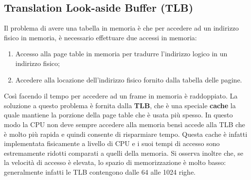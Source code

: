 \subsection{Translation Look-aside Buffer (TLB)}
Il problema di avere una tabella in memoria è che per accedere ad un indirizzo fisico in memoria, è necessario effettuare due accessi in memoria:
\vspace{-4px}
\begin{enumerate}
\setlength{\itemsep}{-1px}
    \item Accesso alla page table in memoria per tradurre l'indirizzo logico in un indirizzo fisico;
    \item Accedere alla locazione dell'indirizzo fisico fornito dalla tabella delle pagine.
\end{enumerate}
Così facendo il tempo per accedere ad un frame in memoria è raddoppiato. La soluzione a questo problema è fornita dalla \textbf{TLB}, che è una speciale \textbf{cache} la quale mantiene la porzione della page table che è usata più spesso. In questo modo la CPU non deve sempre accedere alla memoria bensì accede alla TLB che è molto più rapida e quindi consente di risparmiare tempo. Questa cache è infatti implementata fisicamente a livello di CPU e i suoi tempi di accesso sono estremamente ridotti comparati a quelli della memoria. Si osserva inoltre che, se la velocità di accesso è elevata, lo spazio di memorizzazione è molto basso: generalmente infatti le TLB contengono dalle 64 alle 1024 righe.

